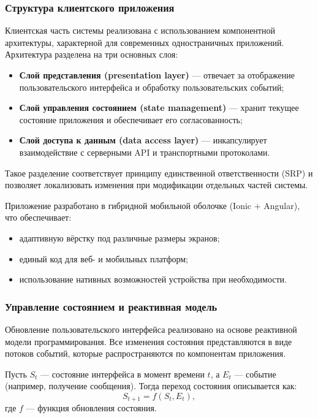 \documentclass{article}
\begin{document}
\subsubsection{Структура клиентского приложения}

Клиентская часть системы реализована с использованием компонентной архитектуры, характерной для современных одностраничных приложений. Архитектура разделена на три основных слоя:

\begin{itemize}
\item \textbf{Слой представления (presentation layer)} — отвечает за отображение пользовательского интерфейса и обработку пользовательских событий;
\item \textbf{Слой управления состоянием (state management)} — хранит текущее состояние приложения и обеспечивает его согласованность;
\item \textbf{Слой доступа к данным (data access layer)} — инкапсулирует взаимодействие с серверными API и транспортными протоколами.
\end{itemize}

Такое разделение соответствует принципу единственной ответственности (SRP) и позволяет локализовать изменения при модификации отдельных частей системы.

Приложение разработано в гибридной мобильной оболочке (Ionic + Angular), что обеспечивает:
\begin{itemize}
\item адаптивную вёрстку под различные размеры экранов;
\item единый код для веб- и мобильных платформ;
\item использование нативных возможностей устройства при необходимости.
\end{itemize}

\subsubsection{Управление состоянием и реактивная модель}

Обновление пользовательского интерфейса реализовано на основе реактивной модели программирования. Все изменения состояния представляются в виде потоков событий, которые распространяются по компонентам приложения.

Пусть $S_t$ — состояние интерфейса в момент времени $t$, а $E_t$ — событие (например, получение сообщения). Тогда переход состояния описывается как:
\[
S_{t+1} = f(S_t, E_t),
\]
где $f$ — функция обновления состояния.
\end{document}
